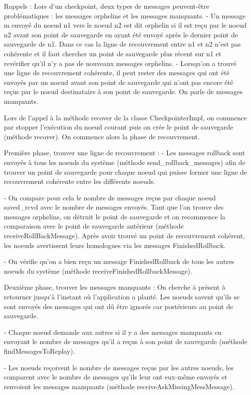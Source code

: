 \documentclass[11pt,a4paper]{report}
\begin{document}
Rappels :
Lors d'un checkpoint, deux types de messages peuvent-être problématiques : les messages orphelins et les messages manquants.
- Un message m envoyé du noeud n1 vers le noeud n2 est dit orphelin si il est reçu par le noeud n2 avant son point de sauvegarde en ayant été envoyé après le dernier point de sauvegarde de n1. Dans ce cas la ligne de recouvrement entre n1 et n2 n'est pas cohérente et il faut chercher un point de sauvegarde plus récent sur n1 et revérifier qu'il n'y a pas de nouveaux messages orphelins.
- Lorsqu'on a trouvé une ligne de recouvrement cohérente, il peut rester des messages qui ont été envoyés par un noeud avant son point de sauvegarde qui n'ont pas encore été reçus par le noeud destinataire à son point de sauvegarde. On parle de messages manquants.


Lors de l'appel à la méthode recover de la classe CheckpointerImpl, on commence par stopper l'exécution du noeud courant puis on crée le point de sauvegarde (méthode recover). On commence alors la phase de recouvrement.


Première phase, trouver une ligne de recouvrement :
- Les messages rollback sont envoyés à tous les noeuds du système (méthode send_rollback_messages) afin de trouver un point de sauvegarde pour chaque noeud qui puisse former une ligne de recouvrement cohérente entre les différents noeuds.

- On compare pour cela le nombre de messages reçus par chaque noeud saved_rcvd avec le nombre de messages envoyés. Tant que l'on trouve des messages orphelins, on détruit le point de sauvegarde et on recommence la comparaison avec le point de sauvegarde antérieur (méthode receiveRollBackMessage). Après avoir trouvé un point de recouvrement cohérent, les noeuds avertissent leurs homologues via les messages FinishedRollback.

- On vérifie qu'on a bien reçu un message FinishedRollback de tous les autres noeuds du système (méthode receiveFinishedRollbackMessage).


Deuxième phase, trouver les messages manquants :
On cherche à présent à retourner jusqu'à l'instant où l'application a planté. Les noeuds savent qu'ils se sont envoyés des messages qui ont dû être ignorés car postérieurs au point de sauvegarde.

- Chaque noeud demande aux autres si il y a des messages manquants en envoyant le nombre de messages qu'il a reçus à son point de sauvegarde (méthode findMessagesToReplay).

- Les noeuds reçoivent le nombre de messages reçus par les autres noeuds, les comparent avec le nombre de messages qu'ils leur ont eux-même envoyés et renvoient les messages manquants (méthode receiveAskMissingMessMessage).
\end{document}

